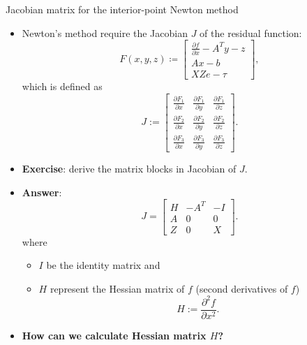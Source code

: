 %
%
\begin{frame}{Jacobian matrix for the interior-point Newton method}
%
\lcol
\begin{itemize}
\item Newton's method require the Jacobian $J$ of the residual function:
\[
F(x,y,z)
\coloneqq\begin{bmatrix}
\frac{\partial f}{\partial x}-A^{T}y-z\\
Ax-b\\
XZe-\tau
\end{bmatrix},
\]
which is defined as  
\[
J :=\begin{bmatrix}
\frac{\partial F_1}{\partial x} & \frac{\partial F_1}{\partial y} & \frac{\partial F_1}{\partial z}\\
\frac{\partial F_2}{\partial x} & \frac{\partial F_2}{\partial y} & \frac{\partial F_2}{\partial z}\\
\frac{\partial F_3}{\partial x} & \frac{\partial F_3}{\partial y} &\frac{\partial F_3}{\partial z}
\end{bmatrix}.
\]
%
\pause
\item \alert{\textbf{Exercise}}: derive the matrix blocks in Jacobian of $J$.
\end{itemize}
\rcol
\pause
\begin{itemize}
	\item {\bf Answer}:
	\[
	J
	=\begin{bmatrix}
			H & -A^{T} & -I\\
			A & 0 & 0\\
			Z & 0 & X
		\end{bmatrix}.
	\]
where 
\begin{itemize}
	\item $I$ be the identity matrix and
	\item $H$ represent the Hessian matrix of $f$ (second derivatives of $f$)
	\[
	H :=
	\frac{\partial^{2}f}{\partial x^{2}}.
	\]
\end{itemize}
%
\pause
\item \alert{\bf How can we calculate Hessian matrix $H$?}
\end{itemize}

\ecol
\end{frame}
